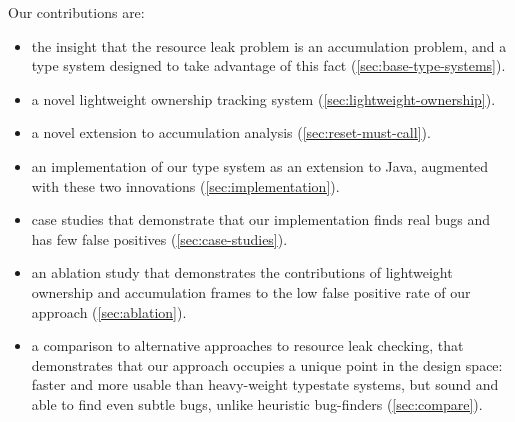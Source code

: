 Our contributions are:
\begin{itemize}
\item the insight that the resource leak problem is an accumulation problem,
  and a type system designed to take advantage of this fact (\cref{sec:base-type-systems}).
\item a novel lightweight ownership tracking system (\cref{sec:lightweight-ownership}).
\item a novel extension to accumulation analysis (\cref{sec:reset-must-call}).
\item an implementation of our type system as an extension to Java,
  augmented with these two innovations (\cref{sec:implementation}).
\item case studies that demonstrate that our implementation finds real
  bugs and has few false positives (\cref{sec:case-studies}).
\item an ablation study that demonstrates the contributions of
  lightweight ownership and accumulation frames to the low false
  positive rate of our approach (\cref{sec:ablation}).
\item a comparison to alternative approaches to resource leak
  checking, that demonstrates that our approach occupies a unique
  point in the design space: faster and more usable than heavy-weight
  typestate systems, but sound and able to find even subtle bugs,
  unlike heuristic bug-finders (\cref{sec:compare}).
\end{itemize}
  
